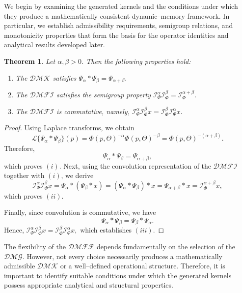 \documentclass[11pt]{article}
\numberwithin{equation}{section}
\newtheorem{theorem}[definition]{Theorem}
\begin{document}
We begin by examining the generated kernels and the conditions under which they produce a mathematically consistent dynamic--memory framework. In particular, we establish admissibility requirements, semigroup relations, and monotonicity properties that form the basis for the operator identities and analytical results developed later.


\begin{theorem}
Let $\alpha,\beta>0$. Then the following properties hold:
\begin{enumerate}[label=(\roman*)]
\item The $\mathcal{DMK}$  satisfies
\(
\Psi_\alpha * \Psi_\beta
=
\Psi_{\alpha+\beta}.
\)

\item The $\mathcal{DMFI}$  satisfies the semigroup property
\(
\mathcal I_\Phi^\alpha
\mathcal I_\Phi^\beta
=
\mathcal I_\Phi^{\alpha+\beta}.
\)

\item The $\mathcal{DMFI}$  is commutative, namely,
\(
\mathcal I_\Phi^\alpha
\mathcal I_\Phi^\beta x
=
\mathcal I_\Phi^\beta
\mathcal I_\Phi^\alpha x.
\)
\end{enumerate}
\end{theorem}

\begin{proof}
Using Laplace transforms, we obtain
\[
\mathcal L\{\Psi_\alpha * \Psi_\beta\}(p)
=
\Phi(p,\Theta)^{-\alpha}
\Phi(p,\Theta)^{-\beta}
=
\Phi(p,\Theta)^{-(\alpha+\beta)}.
\]
Therefore,
\[
\Psi_\alpha * \Psi_\beta
=
\Psi_{\alpha+\beta},
\]
which proves $(i)$.
Next, using the convolution representation of the $\mathcal{DMFI}$ together with $(i)$, we derive
\[
\mathcal I_\Phi^\alpha
\mathcal I_\Phi^\beta x
=
\Psi_\alpha * (\Psi_\beta * x)
=
(\Psi_\alpha * \Psi_\beta)*x
=
\Psi_{\alpha+\beta}*x
=
\mathcal I_\Phi^{\alpha+\beta}x,
\]
which proves $(ii)$.

Finally, since convolution is commutative, we have
\[
\Psi_\alpha * \Psi_\beta
=
\Psi_\beta * \Psi_\alpha.
\]
Hence,
\(
\mathcal I_\Phi^\alpha
\mathcal I_\Phi^\beta x
=
\mathcal I_\Phi^\beta
\mathcal I_\Phi^\alpha x,
\)
which establishes $(iii)$.
\end{proof}


The flexibility of the $\mathcal{DMFF}$ depends fundamentally on the selection of the $\mathcal{DMG}$.
However, not every choice necessarily produces a mathematically admissible
$\mathcal{DMK}$ or a well--defined operational structure. Therefore, it is important
to identify suitable conditions under which the generated kernels possess
appropriate analytical and structural properties.
\end{document}
